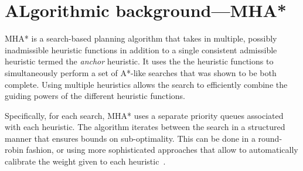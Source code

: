 \documentclass[conference]{IEEEtran}
\begin{document}
%
%
%
%
%
%
%
%
%
%
%
\section{ALgorithmic background---MHA*}
\label{sec:mha}

MHA* is a search-based planning algorithm that takes in multiple, possibly inadmissible heuristic functions in addition to a single consistent admissible heuristic termed the \emph{anchor} heuristic.
It uses the the heuristic functions to simultaneously perform a set of A*-like searches that was shown to be both complete.
Using multiple heuristics allows the search to efficiently combine the guiding powers of the different heuristic functions. 

Specifically, for each search, MHA* uses a separate priority queues associated with each heuristic. 
The algorithm iterates between the search in a structured manner that ensures bounds on sub-optimality. 
This can be done in a round-robin fashion, or using more 
sophisticated approaches that allow to automatically calibrate the weight given to each heuristic~\cite{PNAL15}.
\end{document}
